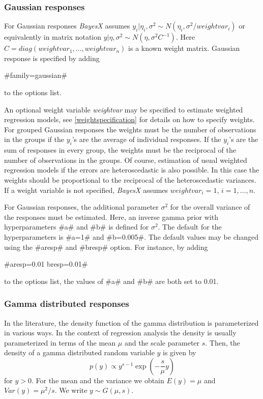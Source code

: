 \subsubsection*{Gaussian responses}

For Gaussian responses {\em BayesX} assumes $y_i | \eta_i,\sigma^2
\sim N(\eta_i,\sigma^2/weightvar_i)$ or equivalently in matrix
notation $y | \eta, \sigma^2 \sim N(\eta,\sigma^2C^{-1})$. Here
$C=diag(weightvar_1,\dots,weightvar_n)$ is a known weight matrix.
Gaussian response is specified by adding

#family=gaussian#

to the options list.

An optional weight variable {\em weightvar} may be specified to
estimate weighted regression models, see
\autoref{weightspecification} for details on how to specify
weights. For grouped Gaussian responses the weights must be the
number of observations in the groups if the $y_i$'s are the
average of individual responses. If the $y_i$'s are the sum of
responses in every group, the weights must be the reciprocal of
the number of observations in the groups. Of course, estimation of
usual weighted regression models if the errors are heteroscedastic
is also possible. In this case the weights should be proportional
to the reciprocal of the heteroscedastic variances. If a weight
variable is not specified, {\em BayesX} assumes $weightvar_i = 1$,
$i=1,\dots,n$.

For Gaussian responses, the additional parameter $\sigma^2$ for
the overall variance of the responses must be estimated. Here, an
inverse gamma prior with hyperparameters #a# and #b# is defined
for $\sigma^2$. The default for the hyperparameters is #a=1# and
#b=0.005#. The default values may be changed using the #aresp# and
#bresp# option. For instance, by adding

#aresp=0.01  bresp=0.01#

to the options list, the values of #a# and #b# are both set to
0.01.

\subsubsection*{Gamma distributed responses}

In the literature, the density function of the gamma distribution
is parameterized in various ways. In the context of regression
analysis the density is usually parameterized in terms of the mean
$\mu$ and the scale parameter $s$. Then, the density of a gamma
distributed random variable $y$ is given by
\begin{equation}
\label{gammapar1} p(y) \propto y^{s-1}\exp \left( -\frac{s}{\mu} y \right)
\end{equation}
for $y > 0$. For the mean and the variance we obtain $E(y) = \mu$
and $Var(y) = \mu^2/s$. We write $y \sim G(\mu,s)$.

